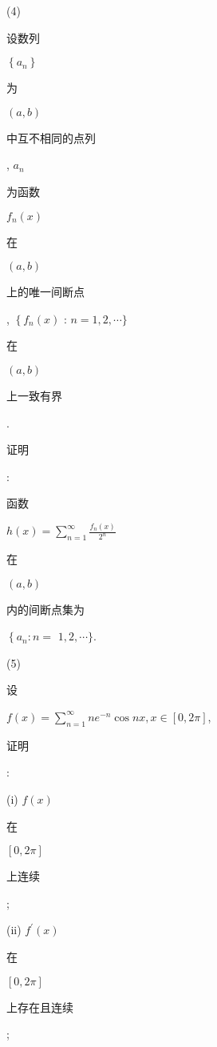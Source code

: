 \documentclass[10pt]{article}
\begin{document}
(4) \begin{CJK}{UTF8}{mj}设数列\end{CJK} $\left\{a_{n}\right\}$ \begin{CJK}{UTF8}{mj}为\end{CJK} $(a, b)$ \begin{CJK}{UTF8}{mj}中互不相同的点列\end{CJK}, $a_{n}$ \begin{CJK}{UTF8}{mj}为函数\end{CJK} $f_{n}(x)$ \begin{CJK}{UTF8}{mj}在\end{CJK} $(a, b)$ \begin{CJK}{UTF8}{mj}上的唯一间断点\end{CJK}, $\left\{f_{n}(x)\right.$ : $n=1,2, \cdots\}$ \begin{CJK}{UTF8}{mj}在\end{CJK} $(a, b)$ \begin{CJK}{UTF8}{mj}上一致有界\end{CJK}. \begin{CJK}{UTF8}{mj}证明\end{CJK}: \begin{CJK}{UTF8}{mj}函数\end{CJK} $h(x)=\sum_{n=1}^{\infty} \frac{f_{n}(x)}{2^{n}}$ \begin{CJK}{UTF8}{mj}在\end{CJK} $(a, b)$ \begin{CJK}{UTF8}{mj}内的间断点集为\end{CJK} $\left\{a_{n}: n=\right.$ $1,2, \cdots\}$.

(5) \begin{CJK}{UTF8}{mj}设\end{CJK} $f(x)=\sum_{n=1}^{\infty} n e^{-n} \cos n x, x \in[0,2 \pi]$, \begin{CJK}{UTF8}{mj}证明\end{CJK}:

(i) $f(x)$ \begin{CJK}{UTF8}{mj}在\end{CJK} $[0,2 \pi]$ \begin{CJK}{UTF8}{mj}上连续\end{CJK};

(ii) $f^{\prime}(x)$ \begin{CJK}{UTF8}{mj}在\end{CJK} $[0,2 \pi]$ \begin{CJK}{UTF8}{mj}上存在且连续\end{CJK};
\end{document}
